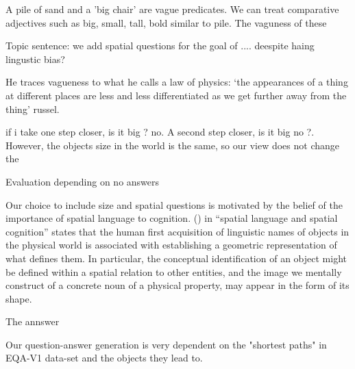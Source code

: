 \cite{kennedy2007vagueness}

A pile of sand  and a 'big chair' are vague predicates. We can treat comparative adjectives such as big, small, tall, bold similar to pile. The vaguness of these 


Topic sentence: we add spatial questions for the goal of .... deespite haing lingustic bias? 



He traces
vagueness to what he calls a law of physics: ‘the appearances of a thing at
different places are less and less differentiated as we get further away from
the thing’ russel. %

if i take one step closer, is it big ? no. A second step closer, is it big no ?. However, the objects size in the world is the same, so our view does not change the 

Evaluation depending on no answers


Our choice to include size and spatial questions is motivated by the belief of the importance of spatial language to cognition. (\cite{landau1993whence}) in “spatial language and spatial cognition” states that the human first acquisition of linguistic names of objects in the physical world is associated with establishing a geometric representation of what defines them. In particular, the conceptual identification of an object might be defined within a spatial relation to other entities, and the image we mentally construct of a concrete noun of a physical property, may appear in the form of its shape.

The annswer 

Our question-answer generation is very dependent on the "shortest paths" in EQA-V1 data-set and the objects they lead to.  



